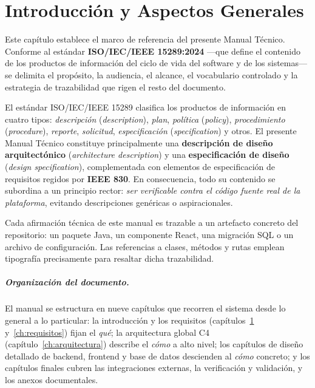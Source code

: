\chapter{Introducción y Aspectos Generales}
\label{ch:introduccion}

Este capítulo establece el marco de referencia del presente Manual Técnico. Conforme
al estándar \textbf{ISO/IEC/IEEE 15289:2024} —que define el contenido de los productos
de información del ciclo de vida del software y de los sistemas— se delimita el
propósito, la audiencia, el alcance, el vocabulario controlado y la estrategia de
trazabilidad que rigen el resto del documento.

El estándar ISO/IEC/IEEE 15289 clasifica los productos de información en cuatro tipos:
\textit{descripción} (\textit{description}), \textit{plan}, \textit{política}
(\textit{policy}), \textit{procedimiento} (\textit{procedure}), \textit{reporte},
\textit{solicitud}, \textit{especificación} (\textit{specification}) y otros. El
presente Manual Técnico constituye principalmente una \textbf{descripción de diseño
arquitectónico} (\textit{architecture description}) y una \textbf{especificación de
diseño} (\textit{design specification}), complementada con elementos de
especificación de requisitos regidos por \textbf{IEEE 830}. En consecuencia, todo su
contenido se subordina a un principio rector: \textit{ser verificable contra el código
fuente real de la plataforma}, evitando descripciones genéricas o aspiracionales.

\begin{AvisoNota}
Cada afirmación técnica de este manual es trazable a un artefacto concreto del
repositorio: un paquete Java, un componente React, una migración SQL o un archivo de
configuración. Las referencias a clases, métodos y rutas emplean tipografía
 precisamente para resaltar dicha trazabilidad.
\end{AvisoNota}

\paragraph{Organización del documento.} El manual se estructura en nueve capítulos que
recorren el sistema desde lo general a lo particular: la introducción y los requisitos
(capítulos~\ref{ch:introduccion} y~\ref{ch:requisitos}) fijan el \textit{qué}; la
arquitectura global C4 (capítulo~\ref{ch:arquitectura}) describe el \textit{cómo} a
alto nivel; los capítulos de diseño detallado de backend, frontend y base de datos
descienden al \textit{cómo} concreto; y los capítulos finales cubren las integraciones
externas, la verificación y validación, y los anexos documentales.

